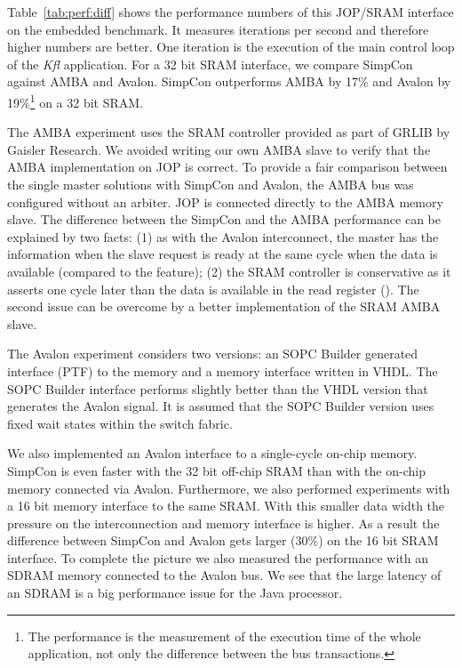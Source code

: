 Table~\ref{tab:perf:diff} shows the performance numbers of this
JOP/SRAM interface on the embedded benchmark. It measures iterations
per second and therefore higher numbers are better. One iteration is
the execution of the main control loop of the \emph{Kfl} application.
For a 32 bit SRAM interface, we compare SimpCon against AMBA and
Avalon. SimpCon outperforms AMBA by 17\% and Avalon by
19\%\footnote{The performance is the measurement of the execution
time of the whole application, not only the difference between the
bus transactions.} on a 32 bit SRAM.

The AMBA experiment uses the SRAM controller provided as part of
GRLIB \cite{grlib} by Gaisler Research. We avoided writing our own
AMBA slave to verify that the AMBA implementation on JOP is correct.
To provide a fair comparison between the single master solutions with
SimpCon and Avalon, the AMBA bus was configured without an arbiter.
JOP is connected directly to the AMBA memory slave. The difference
between the SimpCon and the AMBA performance can be explained by two
facts: (1) as with the Avalon interconnect, the master has the
information when the slave request is ready at the same cycle when
the data is available (compared to the  feature); (2)
the SRAM controller is conservative as it asserts  one
cycle later than the data is available in the read register
(). The second issue can be overcome by a better
implementation of the SRAM AMBA slave.


The Avalon experiment considers two versions: an SOPC Builder
generated interface (PTF) to the memory and a memory interface
written in VHDL. The SOPC Builder interface performs slightly better
than the VHDL version that generates the Avalon 
signal. It is assumed that the SOPC Builder version uses fixed wait
states within the switch fabric.

We also implemented an Avalon interface to a single-cycle on-chip
memory. SimpCon is even faster with the 32 bit off-chip SRAM than
with the on-chip memory connected via Avalon. Furthermore, we also
performed experiments with a 16 bit memory interface to the same
SRAM. With this smaller data width the pressure on the
interconnection and memory interface is higher. As a result the
difference between SimpCon and Avalon gets larger (30\%) on the 16
bit SRAM interface. To complete the picture we also measured the
performance with an SDRAM memory connected to the Avalon bus. We see
that the large latency of an SDRAM is a big performance issue for the
Java processor.
